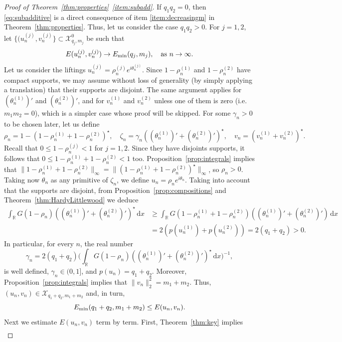 \documentclass[11pt]{article}
\newcommand{\R}{\mathbb{R}}
\newcommand{\boX}{\mathcal{X}}
\newcommand{\Emin}{E_\textup{min}}
\renewcommand{\d}{\,\mathrm{d}}
\theoremstyle{plain}
\theoremstyle{definition}
\theoremstyle{remark}
\numberwithin{equation}{section}
\begin{document}
{\begin{proof}[Proof of Theorem~\ref{thm:properties}~\ref{item:subadd}]
    If $q_1q_2=0$, then \eqref{eq:subadditive} is a direct consequence of item \ref{item:decreasingm} in Theorem~\ref{thm:properties}. Thus, let us consider the case
    $q_1q_2>0$. For $j=1,2$, let $\{(u_n^{(j)},v_n^{(j)}\}\subset \boX_{q_j,m_j}^0$ be such that 
    \[E(u_n^{(j)},v_n^{(j)})\to \Emin(q_j,m_j),\quad\text{as }n\to\infty.\]
    Let us consider the liftings $u_n^{(j)}=\rho_n^{(j)}e^{i\theta_n^{(j)}}$. Since $1-\rho_n^{(1)}$ and $1-\rho_n^{(2)}$ have compact supports, we may assume without loss of generality (by simply applying a translation) that their supports are disjoint. The same argument applies for $(\theta_n^{(1)})'$ and $(\theta_n^{(2)})'$, and for $v_n^{(1)}$ and $v_n^{(2)}$ unless one of them is zero (i.e. $m_1m_2=0$), which is a simpler case whose proof will be skipped. For some $\gamma_n>0$ to be chosen later, let us define
    \[\rho_n=1-(1-\rho_n^{(1)}+1-\rho_n^{(2)})^\star,\quad \zeta_n=\gamma_n((\theta_n^{(1)})'+(\theta_n^{(2)})')^\star,\quad v_n=(v_n^{(1)}+v_n^{(2)})^\star.\]
    Recall that $0\leq 1-\rho_n^{(j)}<1$ for $j=1,2$. Since they have disjoints supports, it follows that $0\leq 1-\rho_n^{(1)}+1-\rho_n^{(2)}<1$ too.   Proposition~\ref{prop:integrals} implies that $\|1-\rho_n^{(1)}+1-\rho_n^{(2)}\|_\infty=\|(1-\rho_n^{(1)}+1-\rho_n^{(2)})^\star\|_\infty$, so  $\rho_n>0$. Taking now $\theta_n$ as any primitive of $\zeta_n$, we define $u_n=\rho_ne^{i\theta_n}$. Taking into account that the supports are disjoint, from Proposition~\ref{prop:compositions} and Theorem~\ref{thm:HardyLittlewood} we deduce
    \begin{align*}
       \int_\R G(1-\rho_n)((\theta_n^{(1)})'+(\theta_n^{(2)})')^\star \d x&\geq\int_\R G(1-\rho_n^{(1)}+1-\rho_n^{(2)})((\theta_n^{(1)})'+(\theta_n^{(2)})') \d x
        \\
        \nonumber &=2(p(u_n^{(1)})+p(u_n^{(2)}))=2(q_1+q_2)>0.
    \end{align*}    
    In particular, for every $n$, the real number 
    \[\gamma_n=2(q_1+q_2)\Big(\int_\R G(1-\rho_n)((\theta_n^{(1)})'+(\theta_n^{(2)})')^\star \d x\Big)^{-1},\]
    is well defined, $\gamma_n\in (0,1]$, and $p(u_n)=q_1+q_2$. Moreover, Proposition~\ref{prop:integrals} implies that $\|v_n\|^2_2=m_1+m_2$.  Thus, $(u_n,v_n)\in\boX_{q_1+q_2,m_1+m_2}$ and, in turn, 
    \[\Emin(q_1+q_2,m_1+m_2)\leq E(u_n,v_n).\]
    Next we estimate $E(u_n,v_n)$ term by term. First, Theorem~\ref{thm:key} implies
    \begin{align*}

\end{align*}
\end{proof}}
\end{document}
